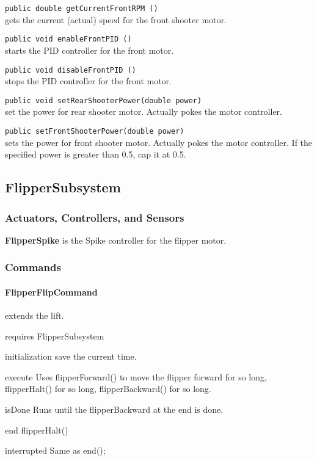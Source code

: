 \documentclass[]{article}
\begin{document}
\noindent
\lstinline[]|public double getCurrentFrontRPM ()| \\
gets the current (actual) speed for the front shooter motor.

\noindent
\lstinline[]|public void enableFrontPID ()| \\
starts the PID controller for the front motor.

\noindent
\lstinline[]|public void disableFrontPID ()| \\
stops the PID controller for the front motor.

\noindent
\lstinline[]|public void setRearShooterPower(double power)| \\
set the power for rear shooter motor. Actually pokes the motor controller.

\noindent
\lstinline[]|public setFrontShooterPower(double power)| \\
sets the power for front shooter motor. Actually pokes the motor controller. If the specified power is greater than 0.5, cap it at 0.5.


\subsection{FlipperSubsystem}

\subsubsection{Actuators, Controllers, and Sensors}

\textbf{FlipperSpike} is the Spike controller for the flipper motor.

\subsubsection{Commands}

\paragraph{FlipperFlipCommand} extends the lift.
\begin{description}[topsep=0ex]
\item[requires] FlipperSubsystem
\item[initialization]  save the current time.
\item[execute] Uses flipperForward() to move the flipper forward for so long, flipperHalt() for so long, flipperBackward() for so long.
\item[isDone] Runs until the flipperBackward at the end is done.
\item[end] flipperHalt()
\item[interrupted] Same as end();
\end{description}
\end{document}
